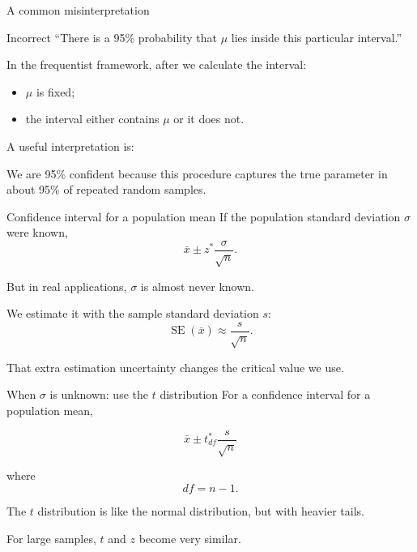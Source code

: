 \documentclass[11pt,aspectratio=169]{beamer}
\newcommand{\SE}{\operatorname{SE}}
\begin{document}
\begin{frame}{A common misinterpretation}
\begin{alertblock}{Incorrect}
``There is a 95\% probability that $\mu$ lies inside this particular interval.''
\end{alertblock}

\vspace{0.7em}
In the frequentist framework, after we calculate the interval:
\begin{itemize}
  \item $\mu$ is fixed;
  \item the interval either contains $\mu$ or it does not.
\end{itemize}

\vspace{0.7em}
A useful interpretation is:

\begin{center}
\large We are \alert{95\% confident} because this procedure captures the true parameter in about 95\% of repeated random samples.
\end{center}
\end{frame}

\begin{frame}{Confidence interval for a population mean}
If the population standard deviation $\sigma$ were known,
\[
\bar{x}\pm z^*\frac{\sigma}{\sqrt{n}}.
\]

But in real applications, $\sigma$ is almost never known.

\vspace{0.8em}
We estimate it with the sample standard deviation $s$:
\[
\SE(\bar{x})\approx\frac{s}{\sqrt{n}}.
\]

That extra estimation uncertainty changes the critical value we use.
\end{frame}

\begin{frame}{When $\sigma$ is unknown: use the $t$ distribution}
For a confidence interval for a population mean,

\[
\boxed{\bar{x}\pm t^*_{df}\frac{s}{\sqrt{n}}}
\]

where
\[
\boxed{df=n-1}.
\]

\vspace{0.7em}
The $t$ distribution is like the normal distribution, but with heavier tails.

\vfill
\alert{For large samples, $t$ and $z$ become very similar.}
\end{frame}
\end{document}

